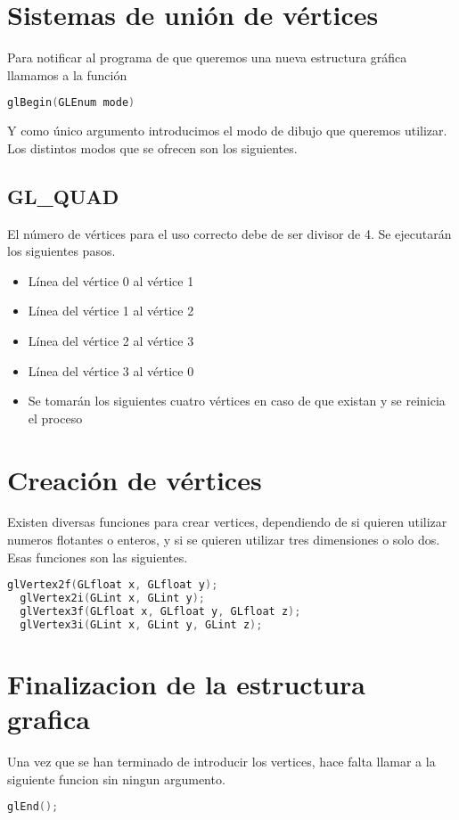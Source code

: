 \section{Sistemas de unión de vértices}
Para notificar al programa de que queremos una nueva estructura gráfica llamamos a la función
\begin{lstlisting}[language=C]
  glBegin(GLEnum mode)
\end{lstlisting}
Y como único argumento introducimos el modo de dibujo que queremos utilizar. Los distintos modos que se ofrecen son los siguientes.
\subsection{GL\_QUAD}
El número de vértices para el uso correcto debe de ser divisor de 4. Se ejecutarán los siguientes pasos.
\begin{itemize}
  \item{Línea del vértice 0 al vértice 1}
  \item{Línea del vértice 1 al vértice 2}
  \item{Línea del vértice 2 al vértice 3}
  \item{Línea del vértice 3 al vértice 0}
    \item{Se tomarán los siguientes cuatro vértices en caso de que existan y se reinicia el proceso}
\end{itemize}
\section{Creación de vértices}
Existen diversas funciones para crear vertices, dependiendo de si quieren utilizar numeros flotantes o enteros, y si se quieren utilizar tres dimensiones o solo dos. Esas funciones son las siguientes.
\begin{lstlisting}[language=C]
  glVertex2f(GLfloat x, GLfloat y);
  glVertex2i(GLint x, GLint y);
  glVertex3f(GLfloat x, GLfloat y, GLfloat z);
  glVertex3i(GLint x, GLint y, GLint z);
\end{lstlisting}
\section{Finalizacion de la estructura grafica}
Una vez que se han terminado de introducir los vertices, hace falta llamar a la siguiente funcion sin ningun argumento.
\begin{lstlisting}[language=C]
  glEnd();
\end{lstlisting}
